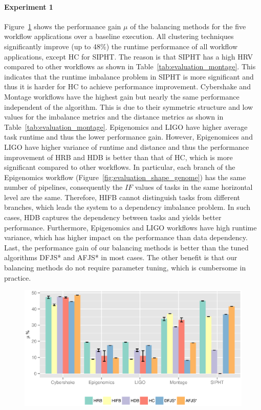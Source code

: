\paragraph{\textbf{Experiment 1}}
Figure~\ref{fig:evaluation_algorithm} shows the performance gain $\mu$ of the balancing methods for the five workflow applications over a baseline execution. All clustering techniques significantly improve (up to 48\%) the runtime performance of all workflow applications, except HC for SIPHT. The reason is that SIPHT has a high HRV compared to other workflows as shown in Table~\ref{tab:evaluation_montage}. This indicates that the runtime imbalance problem in SIPHT is more significant and thus it is harder for HC to achieve performance improvement. Cybershake and Montage workflows have the highest gain but nearly the same performance independent of the algorithm. This is due to their symmetric structure and low values for the imbalance metrics and the distance metrics as shown in Table~\ref{tab:evaluation_montage}. 
Epigenomics and LIGO have higher average task runtime and thus the lower performance gain. However, Epigenomices and LIGO have higher variance of runtime and distance and thus the performance improvement of HRB and HDB is better than that of HC, which is more significant compared to other workflows. 
In particular, each branch of the Epigenomics workflow (Figure~\ref{fig:evaluation_shape_genome}) has the same number of pipelines, consequently the $IF$ values of tasks in the same horizontal level are the same. Therefore, HIFB cannot distinguish tasks from different branches, which leads the system to a dependency imbalance problem. In such cases, HDB captures the dependency between tasks and yields better performance. Furthermore, Epigenomics and LIGO workflows have high runtime variance, which has higher impact on the performance than data dependency. Last, the performance gain of our balancing methods is better than the tuned algorithms DFJS* and AFJS* in most cases. The other benefit is that our balancing methods do not require parameter tuning, which is cumbersome in practice. 

\begin{figure}[htb]
	\centering
	\includegraphics[width=1.0\linewidth]{figures/balance/figure20.eps}
	\label{fig:evaluation_algorithm}
\end{figure}

